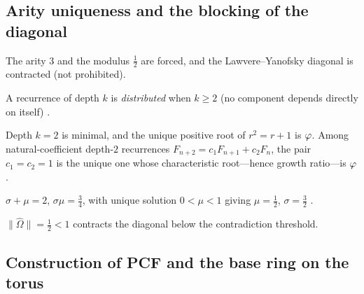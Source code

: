 \subsection{Arity uniqueness and the blocking of the diagonal}\label{ssec:arity}

The arity $3$ and the modulus $\tfrac12$ are forced, and
the Lawvere--Yanofsky diagonal is contracted (not prohibited).

\begin{definition}\label{def:dsr}
A recurrence of depth $k$ is \emph{distributed} when $k\ge 2$ (no component
depends directly on itself) .
\end{definition}

\begin{theorem}\label{fibonacci_minimality}
Depth $k=2$ is minimal, and the unique positive root of $r^2=r+1$ is
$\varphi$. Among natural-coefficient depth-$2$ recurrences
$F_{n+2}=c_1F_{n+1}+c_2F_n$, the pair $c_1=c_2=1$ is the unique one whose
characteristic root---hence growth ratio---is $\varphi$ .

\end{theorem}

\begin{proposition}[Spectral constraints force $(\sigma,\mu)=(\tfrac32,\tfrac12)$]\label{prop:spectral}
$\sigma+\mu=2$, $\sigma\mu=\tfrac34$, with unique solution
$0<\mu<1$ giving $\mu=\tfrac12$, $\sigma=\tfrac32$ .
\end{proposition}

\begin{remark}[No-diagonal]\label{rmk:no-diagonal}
$\|\hat\Omega\|=\tfrac12<1$ contracts the diagonal below the contradiction
threshold.
\end{remark}

\subsection{Construction of PCF and the base ring on the torus}\label{ssec:construction}

